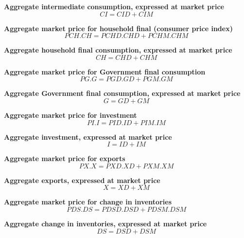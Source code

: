 \documentclass[12pt]{article}
\numberwithin{equation}{section}
\begin{document}
\noindent \textbf{Aggregate intermediate consumption, expressed at market price} 
\begin{dmath}
CI = CID + CIM
\label{SU.mdlCI}
\end{dmath}

\noindent \textbf{Aggregate market price for household final (consumer price index)} 
\begin{dmath}
PCH . CH = PCHD . CHD + PCHM . CHM
\label{SU.mdlPCH}
\end{dmath}

\noindent \textbf{Aggregate household final consumption, expressed at market price} 
\begin{dmath}
CH = CHD + CHM
\label{SU.mdlCH}
\end{dmath}

\noindent \textbf{Aggregate market price for Government final consumption} 
\begin{dmath}
PG . G = PGD . GD + PGM . GM
\label{SU.mdlPG}
\end{dmath}

\noindent \textbf{Aggregate Government final consumption, expressed at market price} 
\begin{dmath}
G = GD + GM
\label{SU.mdlG}
\end{dmath}

\noindent \textbf{Aggregate market price for investment} 
\begin{dmath}
PI . I = PID . ID + PIM . IM
\label{SU.mdlPI}
\end{dmath}

\noindent \textbf{Aggregate investment, expressed at market price} 
\begin{dmath}
I = ID + IM
\label{SU.mdlI}
\end{dmath}

\noindent \textbf{Aggregate market price for exports} 
\begin{dmath}
PX . X = PXD . XD + PXM . XM
\label{SU.mdlPX}
\end{dmath}

\noindent \textbf{Aggregate exports, expressed at market price} 
\begin{dmath}
X = XD + XM
\label{SU.mdlX}
\end{dmath}

\noindent \textbf{Aggregate market price for change in inventories} 
\begin{dmath}
PDS . DS = PDSD . DSD + PDSM . DSM
\label{SU.mdlPDS}
\end{dmath}

\noindent \textbf{Aggregate change in inventories, expressed at market price} 
\begin{dmath}
DS = DSD + DSM
\label{SU.mdlDS}
\end{dmath}
\end{document}
